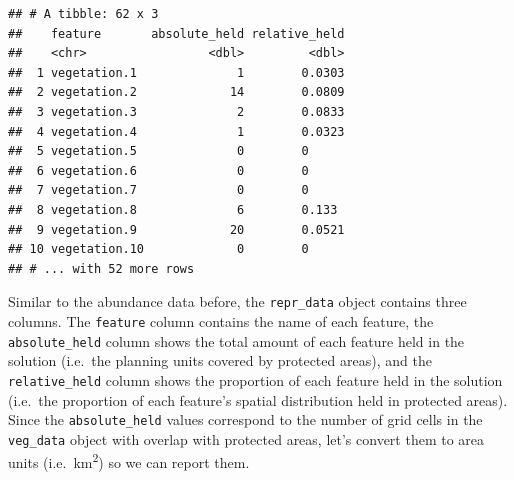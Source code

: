 \documentclass[12pt,]{book}
\newenvironment{Shaded}{\begin{snugshade}}{\end{snugshade}}
\newcommand{\KeywordTok}[1]{\textcolor[rgb]{0.13,0.29,0.53}{\textbf{#1}}}
\newcommand{\StringTok}[1]{\textcolor[rgb]{0.31,0.60,0.02}{#1}}
\newcommand{\CommentTok}[1]{\textcolor[rgb]{0.56,0.35,0.01}{\textit{#1}}}
\newcommand{\OperatorTok}[1]{\textcolor[rgb]{0.81,0.36,0.00}{\textbf{#1}}}
\newcommand{\NormalTok}[1]{#1}
\begin{document}
\begin{Shaded}
\end{Shaded}

\begin{verbatim}
## # A tibble: 62 x 3
##    feature       absolute_held relative_held
##    <chr>                 <dbl>         <dbl>
##  1 vegetation.1              1        0.0303
##  2 vegetation.2             14        0.0809
##  3 vegetation.3              2        0.0833
##  4 vegetation.4              1        0.0323
##  5 vegetation.5              0        0     
##  6 vegetation.6              0        0     
##  7 vegetation.7              0        0     
##  8 vegetation.8              6        0.133 
##  9 vegetation.9             20        0.0521
## 10 vegetation.10             0        0     
## # ... with 52 more rows
\end{verbatim}

Similar to the abundance data before, the \texttt{repr\_data} object
contains three columns. The \texttt{feature} column contains the name of
each feature, the \texttt{absolute\_held} column shows the total amount
of each feature held in the solution (i.e.~the planning units covered by
protected areas), and the \texttt{relative\_held} column shows the
proportion of each feature held in the solution (i.e.~the proportion of
each feature's spatial distribution held in protected areas). Since the
\texttt{absolute\_held} values correspond to the number of grid cells in
the \texttt{veg\_data} object with overlap with protected areas, let's
convert them to area units (i.e.~km\textsuperscript{2}) so we can report
them.
\end{document}
